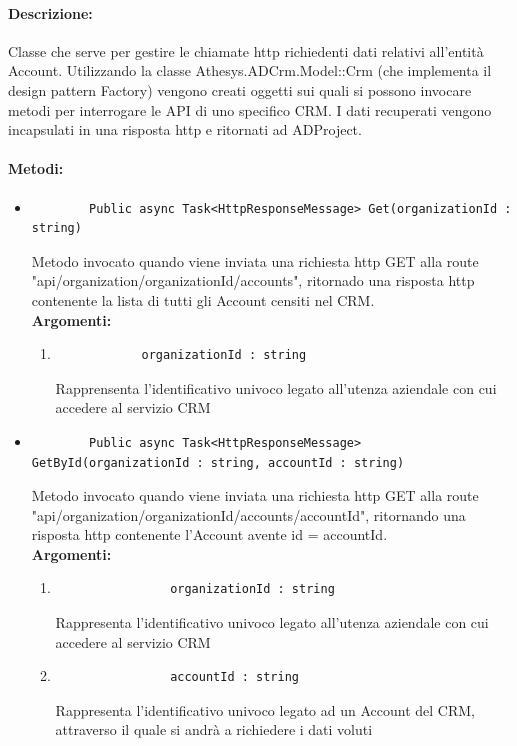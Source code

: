 \paragraph{Descrizione:}
Classe che serve per gestire le chiamate http richiedenti dati relativi all'entità Account. Utilizzando la classe Athesys.ADCrm.Model::Crm (che implementa il design pattern Factory) vengono creati oggetti sui quali si possono invocare metodi per interrogare le API di uno specifico CRM.
I dati recuperati vengono incapsulati in una risposta http e ritornati ad ADProject.

\paragraph{Metodi:}\hfill
\begin{itemize}
	\itemsep0em 
	\item 
		\begin{lstlisting}
		Public async Task<HttpResponseMessage> Get(organizationId : string)
		\end{lstlisting}
		Metodo invocato quando viene inviata una richiesta http GET alla route "api/organization/{organizationId}/accounts", ritornado una risposta http contenente la lista di tutti gli Account censiti nel CRM.\\
		\textbf{\small Argomenti:}
		\begin{enumerate}[leftmargin=*]
			\itemsep0em 
			\item \begin{lstlisting}
			organizationId : string 
			\end{lstlisting}
			Rapprensenta l'identificativo univoco legato all'utenza aziendale con cui accedere al servizio CRM
		\end{enumerate}
		
	\item 
		\begin{lstlisting}
		Public async Task<HttpResponseMessage> GetById(organizationId : string, accountId : string)
		\end{lstlisting}
		Metodo invocato quando viene inviata una richiesta http GET alla route "api/organization/{organizationId}/accounts/{accountId}", ritornando una risposta http contenente l'Account avente id = {accountId}.\\
		\textbf{\small Argomenti:}
		\begin{enumerate}[leftmargin=*]
			\itemsep0em 
			\item 
				\begin{lstlisting}
				organizationId : string 
				\end{lstlisting}
				Rappresenta l'identificativo univoco legato all'utenza aziendale con cui accedere al servizio CRM
			\item 
				\begin{lstlisting}
				accountId : string
				\end{lstlisting}
				Rappresenta l'identificativo univoco legato ad un Account del CRM, attraverso il quale si andrà a richiedere i dati voluti
		\end{enumerate}
\end{itemize}

